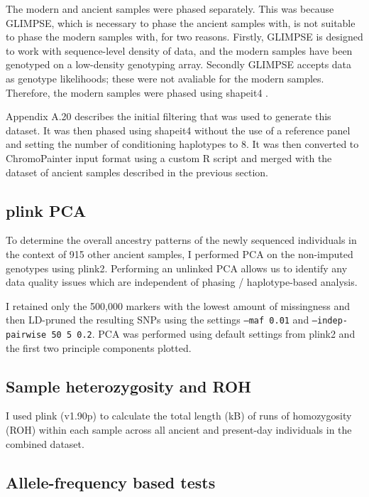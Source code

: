 The modern and ancient samples were phased separately. This was because GLIMPSE, which is necessary to phase the ancient samples with, is not suitable to phase the modern samples with, for two reasons. Firstly, GLIMPSE is designed to work with sequence-level density of data, and the modern samples have been genotyped on a low-density genotyping array. Secondly GLIMPSE accepts data as genotype likelihoods; these were not avaliable for the modern samples. Therefore, the modern samples were phased using shapeit4 \cite{delaneau2018integrative}.

Appendix A.20 describes the initial filtering that was used to generate this dataset. It was then phased using shapeit4 \cite{delaneau2018integrative} without the use of a reference panel and setting the number of conditioning haplotypes to 8. It was then converted to ChromoPainter input format using a custom R script and merged with the dataset of ancient samples described in the previous section.

\subsection{plink PCA}

To determine the overall ancestry patterns of the newly sequenced individuals in the context of 915 other ancient samples, I performed PCA on the non-imputed genotypes using plink2. Performing an unlinked PCA allows us to identify any data quality issues which are independent of phasing / haplotype-based analysis. 

I retained only the 500,000 markers with the lowest amount of missingness and then LD-pruned the resulting SNPs using the settings \texttt{--maf 0.01} and \texttt{--indep-pairwise 50 5 0.2}. PCA was performed using default settings from plink2 and the first two principle components plotted.

\subsection{Sample heterozygosity and ROH}

I used plink (v1.90p) to calculate the total length (kB) of runs of homozygosity (ROH) within each sample across all ancient and present-day individuals in the combined dataset. 

\subsection{Allele-frequency based tests}

